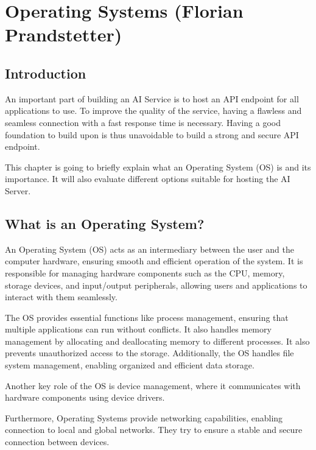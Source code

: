 \chapter{Operating Systems (Florian Prandstetter)}
\label{chap:Operating_Systems_used}


\section {Introduction}

An important part of building an AI Service is to host an API endpoint for all applications to use. To improve the quality of the service, having a flawless and seamless connection with a fast response time is necessary.
Having a good foundation to build upon is thus unavoidable to build a strong and secure API endpoint. 

This chapter is going to briefly explain what an Operating System (OS) is and its importance.
It will also evaluate different options suitable for hosting the AI Server.

\section{What is an Operating System?}
\label{sec:WhatIsAnOs}

An Operating System (OS) acts as an intermediary between the user and the computer hardware, ensuring smooth and efficient operation of the system. It is responsible for managing hardware components such as the CPU, memory, storage devices, and input/output peripherals, allowing users and applications to interact with them seamlessly.

The OS provides essential functions like process management, ensuring that multiple applications can run without conflicts. It also handles memory management by allocating and deallocating memory to different processes. It also prevents unauthorized access to the storage.
Additionally, the OS handles file system management, enabling organized and efficient data storage. 

Another key role of the OS is device management, where it communicates with hardware components using device drivers.

Furthermore, Operating Systems provide networking capabilities, enabling connection to local and global networks. They try to ensure a stable and secure connection between devices.

